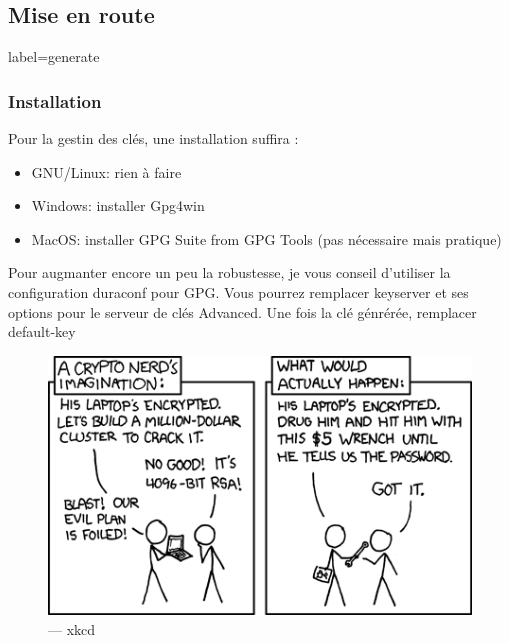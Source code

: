 \documentclass{beamer}
\begin{document}
    \subsection{Mise en route}
        \begin{frame}{label=generate}
            \frametitle{Installation}
            Pour la gestin des clés, une installation suffira \cite{best}:
            \begin{center}
                \begin{itemize}
                    \item GNU/Linux: rien à faire
                    \item Windows: installer Gpg4win
                    \item MacOS: installer GPG Suite from GPG Tools (pas nécessaire mais pratique)
                \end{itemize}
            \end{center}
            \begin{tcolorbox}[colback=green!5,colframe=green!40!black,title=Configuration]
                Pour augmanter encore un peu la robustesse, je vous conseil d'utiliser la configuration duraconf pour GPG.
                Vous pourrez remplacer keyserver et ses options pour le serveur de clés Advanced.
                Une fois la clé génrérée, remplacer default-key
            \end{tcolorbox}
        \end{frame}
        \begin{frame}
            \begin{center}
                \begin{figure}
                    \includegraphics[scale=0.60]{img/security.png}
                    \caption{\cc --- xkcd}
                \end{figure}
            \end{center}
        \end{frame}
\end{document}
